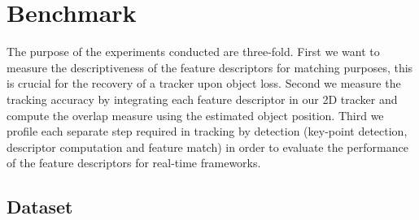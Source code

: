 \section{Benchmark}

The purpose of the experiments conducted are three-fold. First we want to measure the descriptiveness of the feature descriptors for matching purposes, this is crucial for the recovery of a tracker upon object loss. Second we measure the tracking accuracy by integrating each feature descriptor in our 2D tracker and compute the overlap measure using the estimated object position. Third we profile each separate step required in tracking by detection (key-point detection, descriptor computation and feature match) in order to evaluate the performance of the feature descriptors for real-time frameworks.

\subsection{Dataset}

